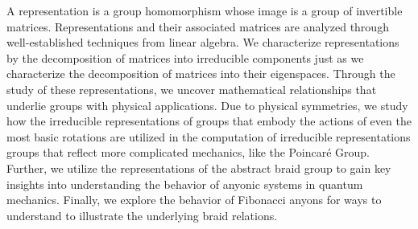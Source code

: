 A representation is a group homomorphism whose image is a group of invertible matrices. Representations and their associated matrices are analyzed through well-established techniques from linear algebra. We characterize representations by the decomposition of matrices into irreducible components just as we characterize the decomposition of matrices into their eigenspaces. Through the study of these representations, we uncover mathematical relationships that underlie groups with physical applications. Due to physical symmetries, we study how the irreducible representations of groups that embody the actions of even the most basic rotations are utilized in the computation of irreducible representations groups that reflect more complicated mechanics, like the Poincar\'e Group. Further, we utilize the representations of the abstract braid group to gain key insights into understanding the behavior of anyonic systems in quantum mechanics. Finally, we explore the behavior of Fibonacci anyons for ways to understand to illustrate the underlying braid relations.